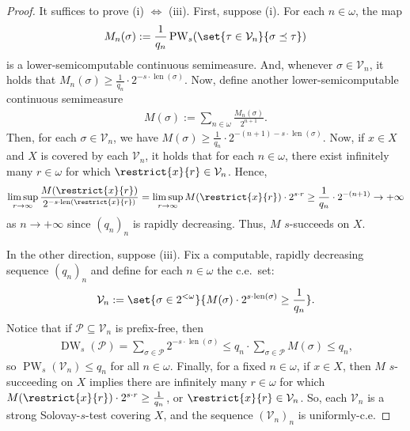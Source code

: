 \begin{proof}
    It suffices to prove (i) $\iff$ (iii). First, suppose (i). For each $n \in \omega$, the map
    \begin{align*}
        M_n(\sigma) := \frac{1}{q_n} \operatorname{PW}_s(\set{\tau\in \mathcal{V}_n}{\sigma \preceq \tau})
    \end{align*}
    is a lower-semicomputable continuous semimeasure. And, whenever $\sigma \in \mathcal{V}_n$, it holds that $M_n(\sigma) \geq \frac{1}{q_n} \cdot 2^{-s \cdot \operatorname{len}(\sigma)}$. Now, define another lower-semicomputable continuous semimeasure
    \begin{align*}
        M(\sigma) := \sum_{n \in \omega} \frac{M_n(\sigma)}{2^{n + 1}}.
    \end{align*}
    Then, for each $\sigma \in \mathcal{V}_n$, we have $M(\sigma) \geq \frac{1}{q_n} \cdot 2^{-(n + 1) - s \cdot \operatorname{len}(\sigma)}$. Now, if $x \in X$ and $X$ is covered by each $\mathcal{V}_n$, it holds that for each $n \in \omega$, there exist infinitely many $r \in \omega$ for which $\restrict{x}{r} \in \mathcal{V}_n$. Hence,
    \begin{align*}
        \limsup_{r \to \infty} \frac{M(\restrict{x}{r})}{2^{-s \cdot \operatorname{len}(\restrict{x}{r})}} = \limsup_{r \to \infty} M(\restrict{x}{r}) \cdot 2^{s \cdot r} \geq \frac{1}{q_n} \cdot 2^{-(n + 1)} \to +\infty
    \end{align*}
    as $n \to +\infty$ since $(q_n)_n$ is rapidly decreasing. Thus, $M$ $s$-succeeds on $X$. 

    In the other direction, suppose (iii). Fix a computable, rapidly decreasing sequence $(q_n)_n$ and define for each $n \in \omega$ the c.e.~set:
    \begin{align*}
        \mathcal{V}_n := \set{\sigma \in 2^{<\omega}}{M(\sigma) \cdot 2^{s \cdot \operatorname{len}(\sigma)} \geq \frac{1}{q_n}}.
    \end{align*}
    Notice that if $\mathcal{P} \subseteq \mathcal{V}_n$ is prefix-free, then
    \begin{align*}
        \operatorname{DW}_s(\mathcal{P}) = \sum_{\sigma \in \mathcal{P}} 2^{- s \cdot \operatorname{len}(\sigma)} \leq q_n \cdot \sum_{\sigma \in \mathcal{P}} M(\sigma) \leq q_n,
    \end{align*}
    so $\operatorname{PW}_s(\mathcal{V}_n) \leq q_n$ for all $n \in \omega$. Finally, for a fixed $n \in \omega$, if $x \in X$, then $M$ $s$-succeeding on $X$ implies there are infinitely many $r \in \omega$ for which $M(\restrict{x}{r}) \cdot 2^{s \cdot r} \geq \frac{1}{q_n}$, or $\restrict{x}{r} \in \mathcal{V}_n$. So, each $\mathcal{V}_n$ is a strong Solovay-$s$-test covering $X$, and the sequence $(\mathcal{V}_n)_n$ is uniformly-c.e.
\end{proof}

